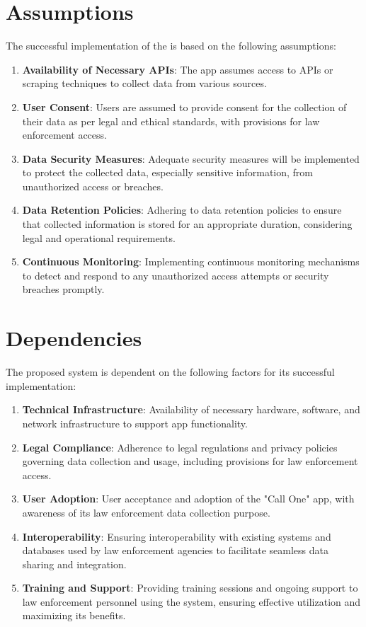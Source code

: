 \section{Assumptions}
The successful implementation of the \textbf{{\myprojectname}} is based on the following assumptions:
\begin{enumerate}[label=\arabic*.]
    \item \textbf{Availability of Necessary APIs}: The app assumes access to APIs or scraping techniques to collect data from various sources.
    \item \textbf{User Consent}: Users are assumed to provide consent for the collection of their data as per legal and ethical standards, with provisions for law enforcement access.
    \item \textbf{Data Security Measures}: Adequate security measures will be implemented to protect the collected data, especially sensitive information, from unauthorized access or breaches.
    \item \textbf{Data Retention Policies}: Adhering to data retention policies to ensure that collected information is stored for an appropriate duration, considering legal and operational requirements.
    \item \textbf{Continuous Monitoring}: Implementing continuous monitoring mechanisms to detect and respond to any unauthorized access attempts or security breaches promptly.
\end{enumerate}

\section{Dependencies}
The proposed system is dependent on the following factors for its successful implementation:
\begin{enumerate}[label=\arabic*.]
    \item \textbf{Technical Infrastructure}: Availability of necessary hardware, software, and network infrastructure to support app functionality.
    \item \textbf{Legal Compliance}: Adherence to legal regulations and privacy policies governing data collection and usage, including provisions for law enforcement access.
    \item \textbf{User Adoption}: User acceptance and adoption of the "Call One" app, with awareness of its law enforcement data collection purpose.
    \item \textbf{Interoperability}: Ensuring interoperability with existing systems and databases used by law enforcement agencies to facilitate seamless data sharing and integration.
    \item \textbf{Training and Support}: Providing training sessions and ongoing support to law enforcement personnel using the system, ensuring effective utilization and maximizing its benefits.
\end{enumerate}

